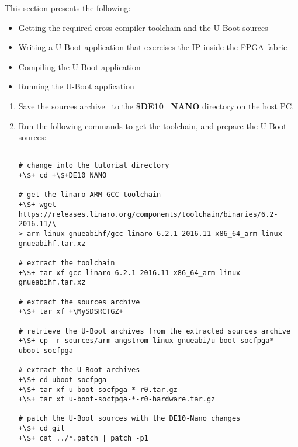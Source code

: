 \begin{flushleft}
\noindent

This section presents the following:

\begin{itemize}

\item Getting the required cross compiler toolchain and the U-Boot sources

\item Writing a U-Boot application that exercises the IP inside the FPGA fabric

\item Compiling the U-Boot application

\item Running the U-Boot application

\end{itemize}

\begin{enumerate}[
	label=\textbf{Step \arabic*.},
	leftmargin=*,
	widest={00},
	align=left]

\item Save the sources archive \MySDSRCTGZ \ to the \textbf{\$DE10\_NANO} directory on the host PC.

\item Run the following commands to get the toolchain, and prepare the U-Boot sources:

\begin{verbatim}

# change into the tutorial directory
+\$+ cd +\$+DE10_NANO

# get the linaro ARM GCC toolchain
+\$+ wget https://releases.linaro.org/components/toolchain/binaries/6.2-2016.11/\
> arm-linux-gnueabihf/gcc-linaro-6.2.1-2016.11-x86_64_arm-linux-gnueabihf.tar.xz

# extract the toolchain
+\$+ tar xf gcc-linaro-6.2.1-2016.11-x86_64_arm-linux-gnueabihf.tar.xz

# extract the sources archive
+\$+ tar xf +\MySDSRCTGZ+

# retrieve the U-Boot archives from the extracted sources archive
+\$+ cp -r sources/arm-angstrom-linux-gnueabi/u-boot-socfpga* uboot-socfpga

# extract the U-Boot archives
+\$+ cd uboot-socfpga
+\$+ tar xf u-boot-socfpga-*-r0.tar.gz
+\$+ tar xf u-boot-socfpga-*-r0-hardware.tar.gz

# patch the U-Boot sources with the DE10-Nano changes
+\$+ cd git
+\$+ cat ../*.patch | patch -p1


\end{verbatim}
\end{enumerate}
\end{flushleft}
